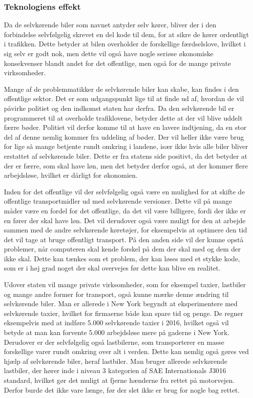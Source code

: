 \subsubsection{Teknologiens effekt}
Da de selvkørende biler som navnet antyder selv kører, bliver der i den forbindelse selvfølgelig skrevet en del kode til dem, for at sikre de kører ordentligt i trafikken. Dette betyder at bilen overholder de forskellige færdselslove, hvilket i sig selv er godt nok, men dette vil også have nogle seriøse økonomiske konsekvenser blandt andet for det offentlige, men også for de mange private virksomheder. 

Mange af de problemmatikker de selvkørende biler kan skabe, kan findes i den offentlige sektor. Det er som udgangspunkt lige til at finde ud af, hvordan de vil påvirke politiet og den indkomst staten har derfra. Da den selvkørende bil er programmeret til at overholde trafiklovene, betyder dette at der vil blive uddelt færre bøder. Politiet vil derfor komme til at have en lavere indtjening, da en stor del af denne nemlig kommer fra uddeling af bøder\cite{B}. Der vil heller ikke være brug for lige så mange betjente rundt omkring i landene, især ikke hvis alle biler bliver erstattet af selvkørende biler. Dette er fra statens side positivt, da det betyder at der er færre, som skal have løn, men det betyder derfor også, at der kommer flere arbejdsløse, hvilket er dårligt for økonomien.

Inden for det offentlige vil der selvfølgelig også være en mulighed for at skifte de offentlige transportmidler ud med selvkørende versioner. Dette vil på mange måder være en fordel for det offentlige, da det vil være billigere, fordi der ikke er en fører der skal have løn. Det vil derudover også være muligt for den at arbejde sammen med de andre selvkørende køretøjer, for eksempelvis at optimere den tid det vil tage at bruge offentligt transport. På den anden side vil der kunne opstå problemer, når computeren skal kende forskel på dem der skal med og dem der ikke skal. Dette kan tænkes som et problem, der kan løses med et stykke kode, som er i høj grad noget der skal overvejes før dette kan blive en realitet\cite{BUS}.

Udover staten vil mange private virksomheder, som for eksempel taxier, lastbiler og mange andre former for transport, også kunne mærke denne ændring til selvkørende biler. Man er allerede i New York begyndt at eksperimentere med selvkørende taxier, hvilket for firmaerne både kan spare tid og penge. De regner eksempelvis med at indføre 5.000 selvkørende taxier i 2016, hvilket også vil betyde at man kan forvente 5.000 arbejdsløse mere på gaderne i New York\cite{TAXI}. \\Derudover er der selvfølgelig også lastbilerne, som transporterer en masse forskellige varer rundt omkring over alt i verden. Dette kan nemlig også gøres ved hjælp af selvkørende biler, heraf lastbiler. Man bruger allerede selvkørende lastbiler, der hører inde i niveau 3 kategorien af SAE Internationals J3016 standard, hvilket gør det muligt at fjerne hænderne fra rettet på motorvejen. Derfor burde det ikke vare længe, før der slet ikke er brug for nogle bag rettet\cite{TRUCKS}. 

